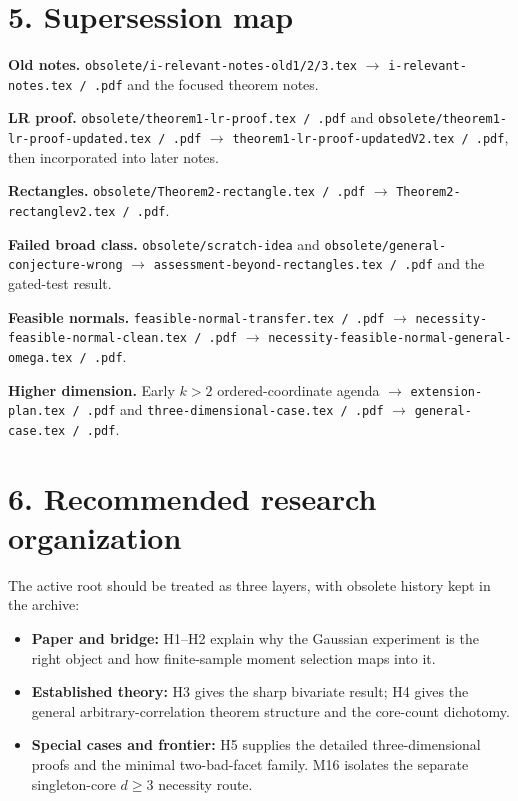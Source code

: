 \documentclass[10pt]{article}
\newcommand{\fname}[1]{{\footnotesize\nolinkurl{#1}}}
\newcommand{\tightitem}{\setlist[itemize]{leftmargin=1.3em,itemsep=1pt,topsep=2pt,parsep=0pt}}
\begin{document}
\section*{5. Supersession map}

\begingroup\small
\noindent\textbf{Old notes.} \fname{obsolete/i-relevant-notes-old1/2/3.tex} $\longrightarrow$ \fname{i-relevant-notes.tex / .pdf} and the focused theorem notes.\par\vspace{2pt}
\noindent\textbf{LR proof.} \fname{obsolete/theorem1-lr-proof.tex / .pdf} and \fname{obsolete/theorem1-lr-proof-updated.tex / .pdf} $\longrightarrow$ \fname{theorem1-lr-proof-updatedV2.tex / .pdf}, then incorporated into later notes.\par\vspace{2pt}
\noindent\textbf{Rectangles.} \fname{obsolete/Theorem2-rectangle.tex / .pdf} $\longrightarrow$ \fname{Theorem2-rectanglev2.tex / .pdf}.\par\vspace{2pt}
\noindent\textbf{Failed broad class.} \fname{obsolete/scratch-idea} and \fname{obsolete/general-conjecture-wrong} $\longrightarrow$ \fname{assessment-beyond-rectangles.tex / .pdf} and the gated-test result.\par\vspace{2pt}
\noindent\textbf{Feasible normals.} \fname{feasible-normal-transfer.tex / .pdf} $\longrightarrow$ \fname{necessity-feasible-normal-clean.tex / .pdf} $\longrightarrow$ \fname{necessity-feasible-normal-general-omega.tex / .pdf}.\par\vspace{2pt}
\noindent\textbf{Higher dimension.} Early $k>2$ ordered-coordinate agenda $\longrightarrow$ \fname{extension-plan.tex / .pdf} and \fname{three-dimensional-case.tex / .pdf} $\longrightarrow$ \fname{general-case.tex / .pdf}.
\endgroup

\section*{6. Recommended research organization}

The active root should be treated as three layers, with obsolete history kept in the archive:

\tightitem
\begin{itemize}
\item \textbf{Paper and bridge:} H1--H2 explain why the Gaussian experiment is the right object and how finite-sample moment selection maps into it.
\item \textbf{Established theory:} H3 gives the sharp bivariate result; H4 gives the general arbitrary-correlation theorem structure and the core-count dichotomy.
\item \textbf{Special cases and frontier:} H5 supplies the detailed three-dimensional proofs and the minimal two-bad-facet family.  M16 isolates the separate singleton-core $d\ge3$ necessity route.
\end{itemize}
\end{document}
